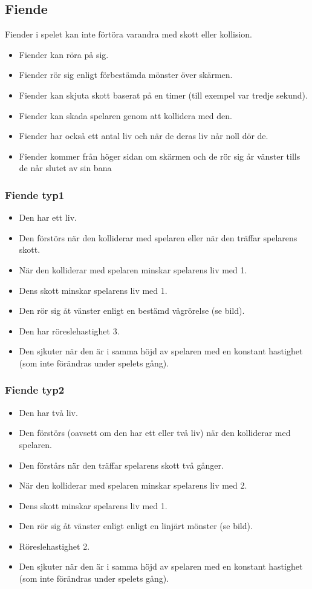 \documentclass{TDP005mall}
\begin{document}
\subsection{Fiende}
Fiender i spelet kan inte förtöra varandra med skott eller kollision.
\begin{itemize}
\item Fiender kan röra på sig.
\item Fiender rör sig enligt förbestämda mönster över skärmen.
\item Fiender kan skjuta skott baserat på en timer (till exempel var tredje sekund).
\item Fiender kan skada spelaren genom att kollidera med den.
\item Fiender har också ett antal liv och när de deras liv når noll dör de.
\item Fiender kommer från höger sidan om skärmen och de rör sig år vänster tills de når slutet av sin bana  
\end{itemize}


\subsubsection*{Fiende typ1}
\begin{itemize}
\item Den har ett liv.
\item Den förstörs när den kolliderar med spelaren eller när den träffar spelarens skott.
\item När den kolliderar med spelaren minskar spelarens liv med 1.
\item Dens skott minskar spelarens liv med 1.
\item Den rör sig åt vänster enligt en bestämd vågrörelse (se bild).
\item Den har röreslehastighet 3.
\item Den sjkuter när den är i samma höjd av spelaren med en konstant hastighet (som inte förändras under spelets gång).
\end{itemize}

\subsubsection*{Fiende typ2}
\begin{itemize}
\item Den har två liv.
\item Den förstörs (oavsett om den har ett eller två liv) när den kolliderar med spelaren.
\item Den förstårs när den träffar spelarens skott två gånger.
\item När den kolliderar med spelaren minskar spelarens liv med 2.
\item Dens skott minskar spelarens liv med 1.
\item Den rör sig åt vänster enligt enligt en linjärt mönster (se bild).
\item Röreslehastighet 2.
\item Den sjkuter när den är i samma höjd av spelaren med en konstant hastighet (som inte förändras under spelets gång).
\end{itemize}
\end{document}
